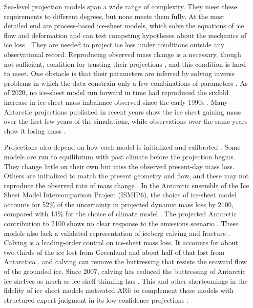 \documentclass[draft,linenumbers]{agujournal2025}
\begin{document}
Sea-level projection models span a wide range of complexity. They meet these requirements to different degrees, but none meets them fully. At the most detailed end are process-based ice-sheet models, which solve the equations of ice flow and deformation and can test competing hypotheses about the mechanics of ice loss \citep{Schoof2007,Morlighem2024}. They are needed to project ice loss under conditions outside any observational record. Reproducing observed mass change is a necessary, though not sufficient, condition for trusting their projections \citep{Aschwanden2021}, and this condition is hard to meet. One obstacle is that their parameters are inferred by solving inverse problems in which the data constrain only a few combinations of parameters \citep{Petra2014,Isaac2015}. As of 2020, no ice-sheet model run forward in time had reproduced the sixfold increase in ice-sheet mass imbalance observed since the early 1990s \citep{Siegert2020}. Many Antarctic projections published in recent years show the ice sheet gaining mass over the first few years of the simulations, while observations over the same years show it losing mass \citep{Fricker2025,Seroussi2024}.

Projections also depend on how each model is initialized and calibrated \citep{Seroussi2020,Goldberg2026}. Some models are run to equilibrium with past climate before the projection begins. They change little on their own but miss the observed present-day mass loss. Others are initialized to match the present geometry and flow, and these may not reproduce the observed rate of mass change \citep{PattynMorlighem2020,vandenAkker2025}. In the Antarctic ensemble of the Ice Sheet Model Intercomparison Project (ISMIP6), the choice of ice-sheet model accounts for 52\% of the uncertainty in projected dynamic mass loss by 2100, compared with 13\% for the choice of climate model \citep{Seroussi2023}. The projected Antarctic contribution to 2100 shows no clear response to the emissions scenario \citep{Edwards2021}. These models also lack a validated representation of iceberg calving and fracture \citep{PattynMorlighem2020,Bassis2024,Benn2026,Jordan2026}. Calving is a leading-order control on ice-sheet mass loss. It accounts for about two thirds of the ice lost from Greenland and about half of that lost from Antarctica \citep{Jordan2026}, and calving can remove the buttressing that resists the seaward flow of the grounded ice. Since 2007, calving has reduced the buttressing of Antarctic ice shelves as much as ice-shelf thinning has \citep{Greene2022}. This and other shortcomings in the fidelity of ice sheet models motivated AR6 to complement these models with structured expert judgment in its low-confidence projections \citep{Bamber2019,Fox-Kemper2021}.
\end{document}
